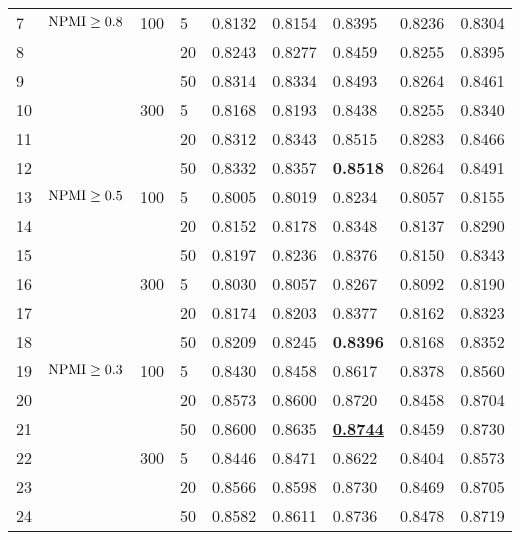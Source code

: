 \begin{table}[!htbp]
\begin{tabular}{G{0.4cm}D{2.1cm}G{0.5cm}G{0.4cm}G{1.18cm}G{1.18cm}G{1.18cm}G{1.18cm}G{1.18cm}}
\midrule

 7 & $\operatorname{NPMI} \geq 0.8$ & 100 &  5 & 0.8132 & 0.8154 & 0.8395 & 0.8236 & 0.8304\\
 8 &                  &     & 20 & 0.8243 & 0.8277 & 0.8459 & 0.8255 & 0.8395\\
 9 &                  &     & 50 & 0.8314 & 0.8334 & 0.8493 & 0.8264 & 0.8461\\[2pt]
10 &                  & 300 &  5 & 0.8168 & 0.8193 & 0.8438 & 0.8255 & 0.8340\\
11 &                  &     & 20 & 0.8312 & 0.8343 & 0.8515 & 0.8283 & 0.8466\\
12 &                  &     & 50 & 0.8332 & 0.8357 & \textbf{0.8518} & 0.8264 & 0.8491\\

\midrule

13 & $\operatorname{NPMI} \geq 0.5$ & 100 &  5 & 0.8005 & 0.8019 & 0.8234 & 0.8057 & 0.8155\\
14 &                  &     & 20 & 0.8152 & 0.8178 & 0.8348 & 0.8137 & 0.8290\\
15 &                  &     & 50 & 0.8197 & 0.8236 & 0.8376 & 0.8150 & 0.8343\\[2pt]
16 &                  & 300 &  5 & 0.8030 & 0.8057 & 0.8267 & 0.8092 & 0.8190\\
17 &                  &     & 20 & 0.8174 & 0.8203 & 0.8377 & 0.8162 & 0.8323\\
18 &                  &     & 50 & 0.8209 & 0.8245 & \textbf{0.8396} & 0.8168 & 0.8352\\

\midrule

19 & $\operatorname{NPMI} \geq 0.3$ & 100 &  5 & 0.8430 & 0.8458 & 0.8617 & 0.8378 & 0.8560\\
20 &                  &     & 20 & 0.8573 & 0.8600 & 0.8720 & 0.8458 & 0.8704\\
21 &                  &     & 50 & 0.8600 & 0.8635 & \underline{\textbf{0.8744}} & 0.8459 & 0.8730\\[2pt]
22 &                  & 300 &  5 & 0.8446 & 0.8471 & 0.8622 & 0.8404 & 0.8573\\
23 &                  &     & 20 & 0.8566 & 0.8598 & 0.8730 & 0.8469 & 0.8705\\
24 &                  &     & 50 & 0.8582 & 0.8611 & 0.8736 & 0.8478 & 0.8719\\

\bottomrule


\end{tabular}
\end{table}
